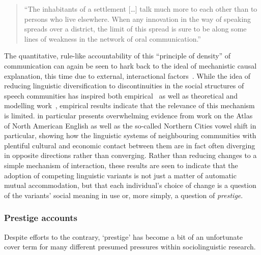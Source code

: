 \begin{quote}
``The inhabitants of a settlement [\ldots] talk much more to each other than to persons who live elsewhere. When any innovation in the way of speaking spreads over a district, the limit of this spread is sure to be along some lines of weakness in the network of oral communication.''
\end{quote}

The quantitative, rule-like accountability of this ``principle of density'' of communication can again be seen to hark back to the ideal of mechanistic causal explanation, this time due to external, interactional factors~\citep[p.19]{Labov2001}. While the idea of reducing linguistic diversification to discontinuities in the social structures of speech communities has inspired both empirical~\citep{Milroy1985,Herold1997,Trudgill2008} as well as theoretical and modelling work~\citep{Nettle1999,Silva2008,Gong2012,Pierrehumbert2014}, empirical results indicate that the relevance of this mechanism is limited.
\citet[ch.6-10]{Labov2010} in particular presents overwhelming evidence from work on the Atlas of North American English as well as the so-called Northern Cities vowel shift in particular, showing how the linguistic systems of neighbouring communities with plentiful cultural and economic contact between them are in fact often diverging in opposite directions rather than converging. Rather than reducing changes to a simple mechanism of interaction, these results are seen to indicate that the adoption of competing linguistic variants is not just a matter of automatic mutual accommodation, but that each individual's choice of change is a question of the variants' social meaning in use or, more simply, a question of \emph{prestige}.


\subsubsection{Prestige accounts}
\label{sec:prestige}

Despite efforts to the contrary, `prestige' has become a bit of an unfortunate cover term for many different presumed pressures within sociolinguistic research. 


